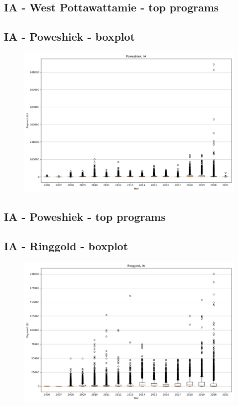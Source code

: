 \subsection*{IA - West Pottawattamie - top programs}

\newpage
\subsection*{IA - Poweshiek - boxplot}
\begin{figure}[h]
\centering
\includegraphics[width=7in]{../output/boxplots/counties/Poweshiek-IA_boxplot.png}
\end{figure}


\subsection*{IA - Poweshiek - top programs}

\newpage
\subsection*{IA - Ringgold - boxplot}
\begin{figure}[h]
\centering
\includegraphics[width=7in]{../output/boxplots/counties/Ringgold-IA_boxplot.png}
\end{figure}


